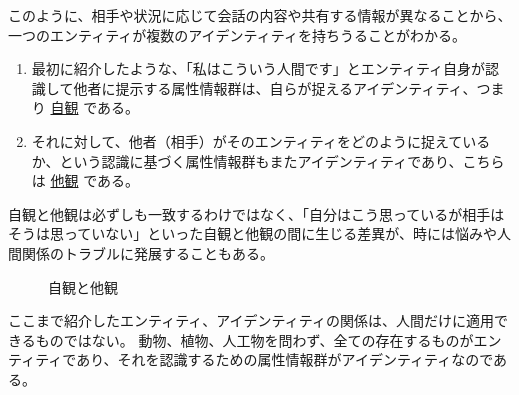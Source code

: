\documentclass[uplatex]{jsarticle}
\def\label#1{}%
\begin{document}
このように、相手や状況に応じて会話の内容や共有する情報が異なることから、一つのエンティティが複数のアイデンティティを持ちうることがわかる。

\begin{dfn}[自観と他観]\label{dfn:self-other-view}
\begin{enumerate}
\item 最初に紹介したような、「私はこういう人間です」とエンティティ自身が認識して他者に提示する属性情報群は、自らが捉えるアイデンティティ、つまり \underline{自観} である。
\item それに対して、他者（相手）がそのエンティティをどのように捉えているか、という認識に基づく属性情報群もまたアイデンティティであり、こちらは \underline{他観} である。
\end{enumerate}
\end{dfn}

\begin{rem}[自観と他観は一致するとは限らない]\label{rem:ch1-self-other-gap}
自観と他観は必ずしも一致するわけではなく、「自分はこう思っているが相手はそうは思っていない」といった自観と他観の間に生じる差異が、時には悩みや人間関係のトラブルに発展することもある。
\end{rem}

\begin{figure}[H]
\centering
{}
\caption{自観と他観}\label{fig:ch1-self-other-view}
\end{figure}

\begin{rem}\label{rem:ch1-non-human-entity}
ここまで紹介したエンティティ、アイデンティティの関係は、人間だけに適用できるものではない。
動物、植物、人工物を問わず、全ての存在するものがエンティティであり、それを認識するための属性情報群がアイデンティティなのである。
\end{rem}
\end{document}
